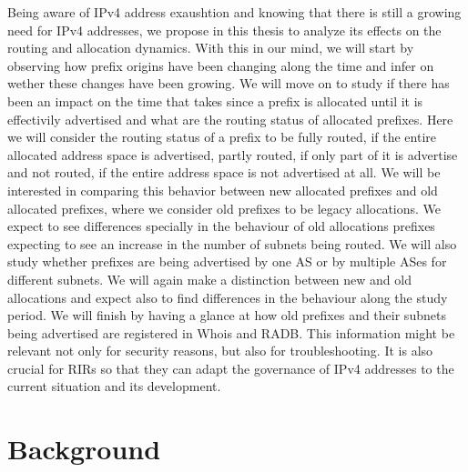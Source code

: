 \documentclass[11pt,a4paper]{scrreprt}
\begin{document}
Being aware of IPv4 address exaushtion and knowing that there is still a growing need for IPv4 addresses, we propose in this thesis to analyze its effects on the routing and allocation dynamics. With this in our mind, we will start by observing how prefix origins have been changing along the time and infer on wether these changes have been growing. We will move on to study if there has been an impact on the time that takes since a prefix is allocated until it is effectivily advertised and what are the routing status of allocated prefixes. Here we will consider the routing status of a prefix to be fully routed, if the entire allocated address space is advertised, partly routed, if only part of it is advertise and not routed, if the entire address space is not advertised at all. We will be interested in comparing this behavior between new allocated prefixes and old allocated prefixes, where we consider old prefixes to be legacy allocations. We expect to see differences specially in the behaviour of old allocations prefixes expecting to see an increase in the number of subnets being routed. 
We will also study whether prefixes are being advertised by one AS or by multiple ASes for different subnets. We will again make a distinction between new and old allocations and expect also to find differences in the behaviour along the study period. We will finish by having a glance at how old prefixes and their subnets being advertised are registered in Whois and RADB. This information might be relevant not only for security reasons, but also for troubleshooting. It is also crucial for RIRs so that they can adapt the governance of IPv4 addresses to the current situation and its development.   



\chapter{Background}
\end{document}
